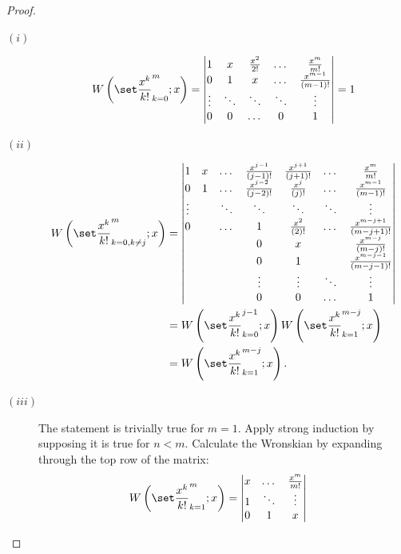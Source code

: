 \documentclass{book}
\begin{document}
\begin{proof}
\begin{description}
\item[$(i)$] \begin{equation*}
\Wpoly{k=0}{m} = \begin{vmatrix} 1 & x & \Poly{2} & \dots & \Poly{m} \\
0 & 1 & x & \dots & \poly{m-1} \\
\vdots & \ddots & \ddots & \ddots & \vdots \\
0 & 0 & \dots & 0 & 1 \end{vmatrix} = 1
\end{equation*}
\item[$(ii)$] \begin{align*}
\Wpoly{k=0,k \neq j}{m} & =
\begin{vmatrix}
1      & x & \dots  & \poly{j-1} & \poly{j+1} & \dots & \Poly{m}    \\
0      & 1 & \dots  & \poly{j-2} & \poly{j}   & \dots & \poly{m-1}  \\
\vdots &   & \ddots & \ddots     & \ddots     & \ddots& \vdots      \\
0      &   & \dots  & 1          & \poly{2}   & \dots & \poly{m-j+1}\\
       &   &        & 0          & x          &       & \poly{m-j}  \\
       &   &        & 0          & 1          &       & \poly{m-j-1}\\
       &   &        & \vdots     & \vdots     & \ddots& \vdots      \\
       &   &        & 0          & 0          & \dots & 1
\end{vmatrix} \\
& = \Wpoly{k=0}{j-1} \Wpoly{k=1}{m-j} \\
& = \Wpoly{k=1}{m-j} .
\end{align*}
\item[$(iii)$] The statement is trivially true for $m=1$.
Apply strong induction by supposing it is true for $n<m$.
Calculate the Wronskian by expanding through the top row of the matrix:
\begin{align*}
\Wpoly{k=1}{m} & = \begin{vmatrix}
x & \dots & \Poly{m} \\
1 & \ddots & \vdots \\
0 & 1 & x \end{vmatrix}

\end{align*}
\end{description}
\end{proof}
\end{document}
